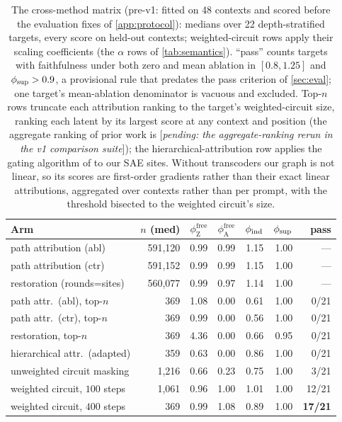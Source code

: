 \documentclass[10pt]{article}
\newcommand{\pending}[1]{\textcolor{red!70!black}{[\textit{pending: #1}]}}
\begin{document}
\begin{table}
\centering
\small
\setlength{\tabcolsep}{5pt}
\begin{tabular}{lrrrrrr}
\toprule
\textbf{Arm} & \textbf{$n$ (med)} & $\phi^{\mathrm{free}}_{\mathrm{Z}}$ & $\phi^{\mathrm{free}}_{\mathrm{A}}$ & $\phi_{\mathrm{ind}}$ & $\phi_{\mathrm{sup}}$ & \textbf{pass} \\
\midrule
path attribution (abl)      & 591{,}120 & 0.99 & 0.99 & 1.15 & 1.00 & --- \\
path attribution (ctr)      & 591{,}152 & 0.99 & 0.99 & 1.15 & 1.00 & --- \\
restoration (rounds=sites)  & 560{,}077 & 0.99 & 0.97 & 1.14 & 1.00 & --- \\
\midrule
path attr.\ (abl), top-$n$  & 369 & 1.08 & 0.00 & 0.61 & 1.00 & 0/21 \\
path attr.\ (ctr), top-$n$  & 369 & 0.99 & 0.00 & 0.56 & 1.00 & 0/21 \\
restoration, top-$n$        & 369 & 4.36 & 0.00 & 0.66 & 0.95 & 0/21 \\
hierarchical attr.\ (adapted) & 359 & 0.63 & 0.00 & 0.86 & 1.00 & 0/21 \\
unweighted circuit masking  & 1{,}216 & 0.66 & 0.23 & 0.75 & 1.00 & 3/21 \\
weighted circuit, $100$ steps & 1{,}061 & 0.96 & 1.00 & 1.01 & 1.00 & 12/21 \\
weighted circuit, $400$ steps & 369 & 0.99 & 1.08 & 0.89 & 1.00 & \textbf{17/21} \\
\bottomrule
\end{tabular}
\caption{The cross-method matrix (pre-v1: fitted on 48 contexts and scored before the evaluation fixes of \cref{app:protocol}): medians over 22 depth-stratified targets, every score on held-out contexts; weighted-circuit rows apply their scaling coefficients (the $\alpha$ rows of \cref{tab:semantics}).
``pass'' counts targets with faithfulness under both zero and mean ablation in $[0.8, 1.25]$ and $\phi_{\mathrm{sup}} > 0.9$, a provisional rule that predates the pass criterion of \cref{sec:eval}; one target's mean-ablation denominator is vacuous and excluded.
Top-$n$ rows truncate each attribution ranking to the target's weighted-circuit size, ranking each latent by its largest score at any context and position (the aggregate ranking of prior work is \pending{the aggregate-ranking rerun in the v1 comparison suite}); the hierarchical-attribution row applies the gating algorithm of \citet{ge2024automatically} to our SAE sites. Without transcoders our graph is not linear, so its scores are first-order gradients rather than their exact linear attributions, aggregated over contexts rather than per prompt, with the threshold bisected to the weighted circuit's size.}
\label{tab:matrix}
\end{table}
\end{document}
